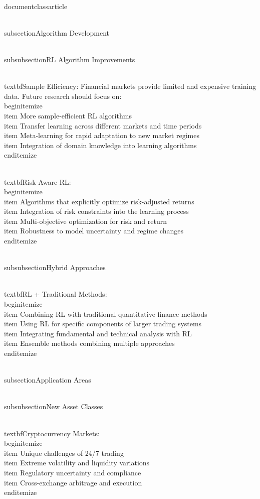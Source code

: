 \\documentclass{article}
\begin{document}
\\subsection{Algorithm Development}

\\subsubsection{RL Algorithm Improvements}

\\textbf{Sample Efficiency}:
Financial markets provide limited and expensive training data. Future research should focus on:
\\begin{itemize}
\\item More sample-efficient RL algorithms
\\item Transfer learning across different markets and time periods
\\item Meta-learning for rapid adaptation to new market regimes
\\item Integration of domain knowledge into learning algorithms
\\end{itemize}

\\textbf{Risk-Aware RL}:
\\begin{itemize}
\\item Algorithms that explicitly optimize risk-adjusted returns
\\item Integration of risk constraints into the learning process
\\item Multi-objective optimization for risk and return
\\item Robustness to model uncertainty and regime changes
\\end{itemize}

\\subsubsection{Hybrid Approaches}

\\textbf{RL + Traditional Methods}:
\\begin{itemize}
\\item Combining RL with traditional quantitative finance methods
\\item Using RL for specific components of larger trading systems
\\item Integrating fundamental and technical analysis with RL
\\item Ensemble methods combining multiple approaches
\\end{itemize}

\\subsection{Application Areas}

\\subsubsection{New Asset Classes}

\\textbf{Cryptocurrency Markets}:
\\begin{itemize}
\\item Unique challenges of 24/7 trading
\\item Extreme volatility and liquidity variations
\\item Regulatory uncertainty and compliance
\\item Cross-exchange arbitrage and execution
\\end{itemize}
\end{document}
